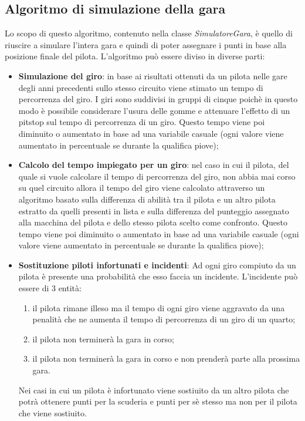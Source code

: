 \subsection{Algoritmo di simulazione della gara}
Lo scopo di questo algoritmo, contenuto nella classe \textit{SimulatoreGara}, è quello di riuscire a simulare l'intera gara e quindi di poter assegnare i punti in base alla posizione finale del pilota. L'algoritmo può essere diviso in diverse parti:
\begin{itemize}

    \item \textbf{Simulazione del giro}: in base ai risultati ottenuti da un pilota nelle gare degli anni precedenti sullo stesso circuito viene stimato un tempo di percorrenza del giro. I giri sono suddivisi in gruppi di cinque poichè in questo modo è possibile considerare l'usura delle gomme e attenuare l'effetto di un pitstop sul tempo di percorrenza di un giro. Questo tempo viene poi diminuito o aumentato in base ad una variabile casuale (ogni valore viene aumentato in percentuale se durante la qualifica piove);
    \item \textbf{Calcolo del tempo impiegato per un giro}: nel caso in cui il pilota, del quale si vuole calcolare il tempo di percorrenza del giro, non abbia mai corso su quel circuito allora il tempo del giro viene calcolato attraverso un algoritmo basato sulla differenza di abilità tra il pilota e un altro pilota estratto da quelli presenti in lista e sulla differenza del punteggio assegnato alla macchina del pilota e dello stesso pilota scelto come confronto. Questo tempo viene poi diminuito o aumentato in base ad una variabile casuale (ogni valore viene aumentato in percentuale se durante la qualifica piove);
    \item \textbf{Sostituzione piloti infortunati e incidenti}: Ad ogni giro compiuto da un pilota è presente una probabilità che esso faccia un incidente. L'incidente può essere di 3 entità: 
    \begin{enumerate}
    \item il pilota rimane illeso ma il tempo di ogni giro viene aggravato da una penalità che ne aumenta il tempo di percorrenza di un giro di un quarto;
    \item il pilota non terminerà la gara in corso;
    \item il pilota non terminerà la gara in corso e non prenderà parte alla prossima gara.
    \end{enumerate}
    Nei casi in cui un pilota è infortunato viene sostiuito da un altro pilota che potrà ottenere punti per la scuderia e punti per sè stesso ma non per il pilota che viene sostiuito.
\end{itemize}
